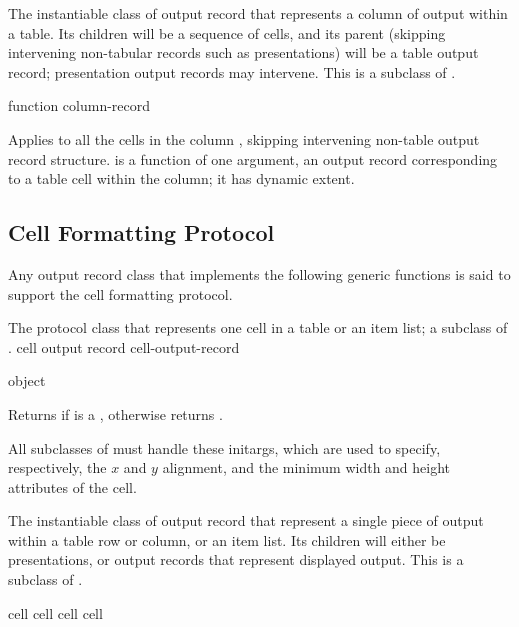 
The instantiable class of output record that represents a column of output within
a table.  Its children will be a sequence of cells, and its parent (skipping
intervening non-tabular records such as presentations) will be a table output
record; presentation output records may intervene.  This is a subclass of
.

 {function column-record}

Applies  to all the cells in the column ,
skipping intervening non-table output record structure.   is a
function of one argument, an output record corresponding to a table cell within
the column; it has dynamic extent.


\subsection {Cell Formatting Protocol}

Any output record class that implements the following generic functions is said
to support the cell formatting protocol.


The protocol class that represents one cell in a table or an item list; a
subclass of .
 {cell output record} {cell-output-record}

 {object}

Returns  if  is a , otherwise
returns .


All subclasses of  must handle these initargs, which are
used to specify, respectively, the $x$ and $y$ alignment, and the minimum width
and height attributes of the cell.


The instantiable class of output record that represent a single piece of output
within a table row or column, or an item list.  Its children will either be
presentations, or output records that represent displayed output.  This is a
subclass of .

 {cell}
 {cell}
  {cell}
 {cell}

